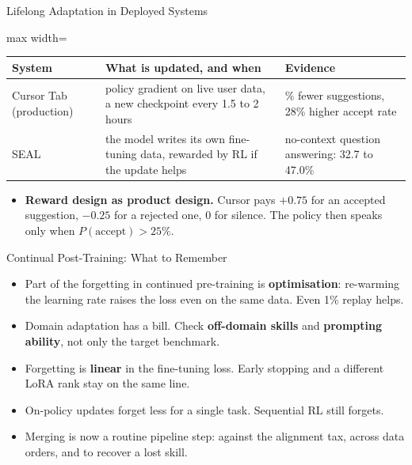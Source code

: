 \begin{frame}{Lifelong Adaptation in Deployed Systems}
    \begin{center}
    \small
    \begin{adjustbox}{max width=\linewidth}\begin{tabular}{>{\raggedright\arraybackslash}p{3.3cm}>{\raggedright\arraybackslash}p{5.3cm}>{\raggedright\arraybackslash}p{4.7cm}}
        \toprule
        \textbf{System} & \textbf{What is updated, and when} & \textbf{Evidence} \\
        \midrule
        \rowcolor{KAUSTcyan!12} Cursor Tab (production) & policy gradient on live user data, a new checkpoint every 1.5 to 2 hours & 21\% fewer suggestions, 28\% higher accept rate \\
        SEAL & the model writes its own fine-tuning data, rewarded by RL if the update helps & no-context question answering: 32.7 to 47.0\% \\
        \bottomrule
    \end{tabular}\end{adjustbox}
    \end{center}
    \begin{itemize}\itemsep0.4em
        \item \textbf{Reward design as product design.} Cursor pays $+0.75$ for an accepted suggestion, $-0.25$ for a rejected one, 0 for silence. The policy then speaks only when $P(\text{accept})>25\%$.
    \end{itemize}
\end{frame}

\begin{frame}{Continual Post-Training: What to Remember}
    \begin{itemize}\itemsep0.6em
        \item Part of the forgetting in continued pre-training is \textbf{optimisation}: re-warming the learning rate raises the loss even on the same data. Even 1\% replay helps.
        \item Domain adaptation has a bill. Check \textbf{off-domain skills} and \textbf{prompting ability}, not only the target benchmark.
        \item Forgetting is \textbf{linear} in the fine-tuning loss. Early stopping and a different LoRA rank stay on the same line.
        \item On-policy updates forget less for a single task. Sequential RL still forgets.
        \item Merging is now a routine pipeline step: against the alignment tax, across data orders, and to recover a lost skill.
    \end{itemize}
    \vspace{0.3em}
\end{frame}
